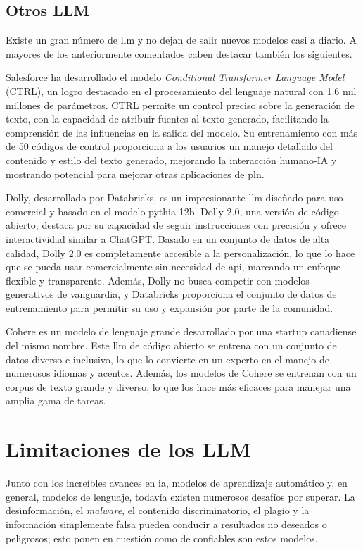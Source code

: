 \subsection{Otros LLM}

Existe un gran número de \acrshort{llm} y no dejan de salir nuevos modelos casi a diario. A mayores de los anteriormente comentados caben destacar también los siguientes.

Salesforce ha desarrollado el modelo \textit{Conditional Transformer Language Model} (CTRL), un logro destacado en el procesamiento del lenguaje natural con 1.6 mil millones de parámetros. CTRL permite un control preciso sobre la generación de texto, con la capacidad de atribuir fuentes al texto generado, facilitando la comprensión de las influencias en la salida del modelo. Su entrenamiento con más de 50 códigos de control proporciona a los usuarios un manejo detallado del contenido y estilo del texto generado, mejorando la interacción humano-IA y mostrando potencial para mejorar otras aplicaciones de \acrlong{pln}.

Dolly, desarrollado por Databricks, es un impresionante \acrfull{llm} diseñado para uso comercial y basado en el modelo pythia-12b. Dolly 2.0, una versión de código abierto, destaca por su capacidad de seguir instrucciones con precisión y ofrece interactividad similar a ChatGPT. Basado en un conjunto de datos de alta calidad, Dolly 2.0 es completamente accesible a la personalización, lo que lo hace que se pueda usar comercialmente sin necesidad de \acrshort{api}, marcando un enfoque flexible y transparente. Además, Dolly no busca competir con modelos generativos de vanguardia, y Databricks proporciona el conjunto de datos de entrenamiento para permitir su uso y expansión por parte de la comunidad.

Cohere es un modelo de lenguaje grande desarrollado por una startup canadiense del mismo nombre. Este \acrshort{llm}  de código abierto se entrena con un conjunto de datos diverso e inclusivo, lo que lo convierte en un experto en el manejo de numerosos idiomas y acentos. Además, los modelos de Cohere se entrenan con un corpus de texto grande y diverso, lo que los hace más eficaces para manejar una amplia gama de tareas.

\section{Limitaciones de los LLM}

Junto con los increíbles avances en \acrlong{ia}, modelos de aprendizaje automático y, en general, modelos de lenguaje, todavía existen numerosos desafíos por superar. La desinformación, el \textit{malware}, el contenido discriminatorio, el plagio y la información simplemente falsa pueden conducir a resultados no deseados o peligrosos; esto ponen en cuestión como de confiables son estos modelos.

